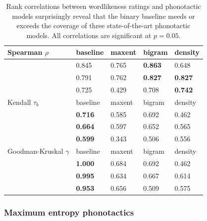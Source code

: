 \begin{table} 
\centering
\begin{tabular}{l l l l l}
\toprule
Spearman $\rho$          & baseline         & maxent  & bigram           & density          \\
\midrule
\citealt{Greenberg1964}  & {0.845}          & {0.765} & {\textbf{0.863}} & {0.648}          \\
\citealt{Scholes1966}    & {0.791}          & {0.762} & {\textbf{0.827}} & {\textbf{0.827}} \\
\citealt{Albright2003b}  & {0.725}          & {0.429} & {0.708}          & {\textbf{0.742}} \\
\midrule
Kendall $\tau_b$         & baseline         & maxent  & bigram           & density          \\
\midrule
\citealt{Greenberg1964}  & {\textbf{0.716}} & {0.585} & {0.692}          & {0.462}          \\
\citealt{Scholes1966}    & {\textbf{0.664}} & {0.597} & {0.652}          & {0.565}          \\
\citealt{Albright2003b}  & {\textbf{0.599}} & {0.343} & {0.506}          & {0.556}          \\
\midrule
Goodman-Kruskal $\gamma$ & baseline         & maxent  & bigram           & density          \\
\midrule
\citealt{Greenberg1964}  & {\textbf{1.000}} & {0.684} & {0.692}          & {0.462}          \\
\citealt{Scholes1966}    & {\textbf{0.995}} & {0.634} & {0.667}          & {0.614}          \\
\citealt{Albright2003b}  & {\textbf{0.953}} & {0.656} & {0.509}          & {0.575}          \\
\bottomrule
\end{tabular}
\caption{Rank correlations between wordlikeness ratings and phonotactic models surprisingly reveal that the binary baseline meeds or exceeds the coverage of three state-of-the-art phonotactic models. All correlations are significant at $p = 0.05$.}
\label{cor}
\end{table}


\subsubsection{Maximum entropy phonotactics}

